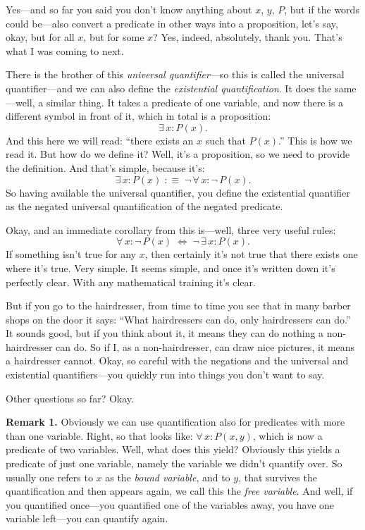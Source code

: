 Yes---and so far you said you don't know anything about $x$, $y$, $P$, but if the words could be---also convert a predicate in other ways into a proposition, let's say, okay, but for all $x$, but for some $x$? Yes, indeed, absolutely, thank you. That's what I was coming to next.

There is the brother of this \emph{universal quantifier}---so this is called the universal quantifier---and we can also define the \emph{existential quantification}. It does the same---well, a similar thing. It takes a predicate of one variable, and now there is a different symbol in front of it, which in total is a proposition:
\[
\exists\, x : P(x).
\]
And this here we will read: ``there exists an $x$ such that $P(x)$.'' This is how we read it. But how do we define it? Well, it's a proposition, so we need to provide the definition. And that's simple, because it's:
\[
\exists\, x : P(x) \;:\equiv\; \lnot\, \forall\, x : \lnot\, P(x).
\]
So having available the universal quantifier, you define the existential quantifier as the negated universal quantification of the negated predicate.

Okay, and an immediate corollary from this is---well, three very useful rules:
\[
\forall\, x : \lnot\, P(x) \;\Leftrightarrow\; \lnot\, \exists\, x : P(x).
\]
If something isn't true for any $x$, then certainly it's not true that there exists one where it's true. Very simple. It seems simple, and once it's written down it's perfectly clear. With any mathematical training it's clear.

But if you go to the hairdresser, from time to time you see that in many barber shops on the door it says: ``What hairdressers can do, only hairdressers can do.'' It sounds good, but if you think about it, it means they can do nothing a non-hairdresser can do. So if I, as a non-hairdresser, can draw nice pictures, it means a hairdresser cannot. Okay, so careful with the negations and the universal and existential quantifiers---you quickly run into things you don't want to say.

Other questions so far? Okay.

\textbf{Remark 1.} Obviously we can use quantification also for predicates with more than one variable. Right, so that looks like: $\forall\, x : P(x, y)$, which is now a predicate of two variables. Well, what does this yield? Obviously this yields a predicate of just one variable, namely the variable we didn't quantify over. So usually one refers to $x$ as the \emph{bound variable}, and to $y$, that survives the quantification and then appears again, we call this the \emph{free variable}. And well, if you quantified once---you quantified one of the variables away, you have one variable left---you can quantify again.

